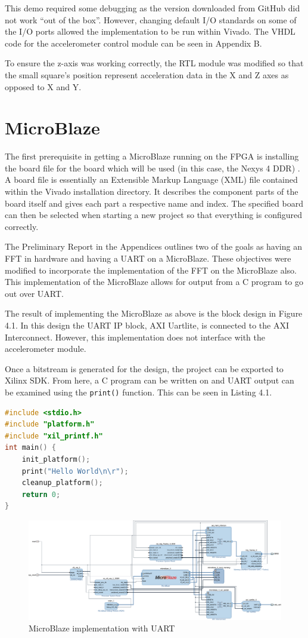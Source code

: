 \documentclass[12pt,a4paper]{report} %
\begin{document}
This demo required some debugging as the version downloaded from GitHub did not work ``out of the box''.
However, changing default I/O standards on some of the I/O ports allowed the implementation to be run within Vivado.
The VHDL code for the accelerometer control module can be seen in Appendix B.

To ensure the z-axis was working correctly, the RTL module was modified so that the small square’s position represent acceleration data in the X and Z axes as opposed to X and Y.

\section{MicroBlaze}
The first prerequisite in getting a MicroBlaze running on the FPGA is installing the board file for the board which will be used (in this case, the Nexys 4 DDR) \cite{mbserver}.
A board file is essentially an Extensible Markup Language (XML) file contained within the Vivado installation directory.
It describes the component parts of the board itself and gives each part a respective name and index.
The specified board can then be selected when starting a new project so that everything is configured correctly.

The Preliminary Report in the Appendices outlines two of the goals as having an FFT in hardware and having a UART on a MicroBlaze.
These objectives were modified to incorporate the implementation of the FFT on the MicroBlaze also.
This implementation of the MicroBlaze allows for output from a C program to go out over UART.

The result of implementing the MicroBlaze as above is the block design in Figure 4.1.
In this design the UART IP block, AXI Uartlite, is connected to the AXI Interconnect.
However, this implementation does not interface with the accelerometer module.

Once a bitstream is generated for the design, the project can be exported to Xilinx SDK.
From here, a C program can be written on and UART output can be examined using the \texttt{print()} function.
This can be seen in Listing 4.1. 
\begin{lstlisting}[caption={``Hello World'' C program},captionpos=b,language=C,frame=single]
#include <stdio.h>
#include "platform.h"
#include "xil_printf.h"
int main() {
    init_platform();
    print("Hello World\n\r");
    cleanup_platform();
    return 0;
}
\end{lstlisting}
\begin{figure}[htbp]
\centerline{\includegraphics[width=1.0\textheight,angle=90,scale=0.9]{diagrams/microblaze0}}
\caption{MicroBlaze implementation with UART}
\end{figure}
\end{document}
